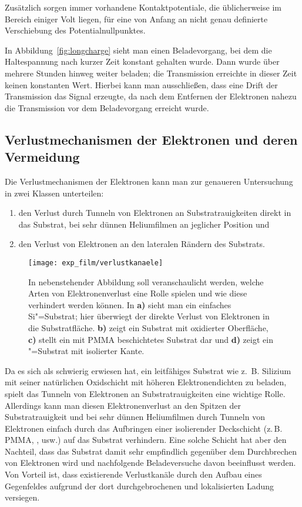 Zusätzlich sorgen immer vorhandene Kontaktpotentiale, die üblicherweise im Bereich einiger Volt liegen, für eine von Anfang an nicht genau definierte Verschiebung des Potentialnullpunktes.

In Abbildung~\ref{fig:longcharge} sieht man einen Beladevorgang, bei dem die Haltespannung nach kurzer Zeit konstant gehalten wurde. Dann wurde über mehrere Stunden hinweg weiter beladen; die Transmission erreichte in dieser Zeit keinen konstanten Wert. Hierbei kann man ausschließen, dass eine Drift der Transmission das Signal erzeugte, da nach dem Entfernen der Elektronen nahezu die Transmission vor dem Beladevorgang erreicht wurde. 
     
\subsection{Verlustmechanismen der Elektronen und deren Vermeidung}
\label{ssec:elektronenverlust}
Die Verlustmechanismen der Elektronen kann man zur genaueren Untersuchung in zwei Klassen unterteilen:

\begin{enumerate}
    \item den Verlust durch Tunneln von Elektronen an Substratrauigkeiten direkt in das Substrat, bei sehr dünnen Heliumfilmen an jeglicher Position und
    \item den Verlust von Elektronen an den lateralen Rändern des Substrats.
\end{enumerate}

\begin{figure}[h!tb]
    \texttt{[image: exp\_film/verlustkanaele]}%
    \hfill%
    \begin{minipage}[b]{\textwidth-\midwidth-\tabcolsep}
        \caption[Verhinderung von Elektronenverlust]{In nebenstehender Abbildung soll veranschaulicht werden, welche Arten von Elektronenverlust eine Rolle spielen und wie diese verhindert werden können. In {\bfseries a)} sieht man ein einfaches Si"=Substrat; hier überwiegt der direkte Verlust von Elektronen in die Substratfläche. {\bfseries b)} zeigt ein Substrat mit oxidierter Oberfläche, {\bfseries c)} stellt ein mit PMMA beschichtetes Substrat dar und {\bfseries d)} zeigt ein \SiO"=Substrat mit isolierter Kante.}
		\label{fig:e_verlust}
    \end{minipage}
\end{figure}

Da es sich als schwierig erwiesen hat, ein leitfähiges Substrat wie z.\ B. Silizium mit seiner natürlichen Oxidschicht mit höheren Elektronendichten zu beladen, spielt das Tunneln von Elektronen an Substratrauigkeiten eine wichtige Rolle. Allerdings kann man diesen Elektronenverlust an den Spitzen der Substratrauigkeit und bei sehr dünnen Heliumfilmen durch Tunneln von Elektronen einfach durch das Aufbringen einer isolierender Deckschicht (z.\,B. PMMA, \SiO, usw.) auf das Substrat verhindern. Eine solche Schicht hat aber den Nachteil, dass das Substrat damit sehr empfindlich gegenüber dem Durchbrechen von Elektronen wird und nachfolgende Beladeversuche davon beeinflusst werden. Von Vorteil ist, dass existierende Verlustkanäle durch den Aufbau eines Gegenfeldes aufgrund der dort durchgebrochenen und lokalisierten Ladung versiegen.

